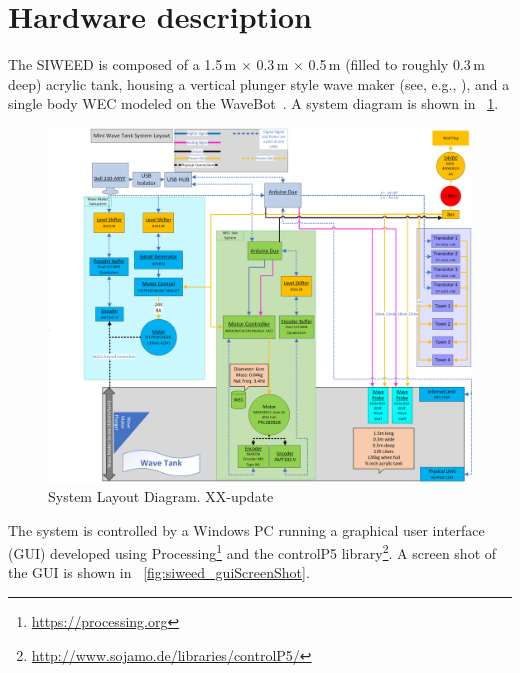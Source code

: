 \documentclass[11pt, letterpaper]{article}
\begin{document}
\section{Hardware description} %
The SIWEED is composed of a 1.5\,m $\times{}$ 0.3\,m $\times{}$ 0.5\,m (filled to roughly 0.3\,m deep) acrylic tank, housing a vertical plunger style wave maker (see, e.g., \cite{hyun1976simplified}), and a single body WEC modeled on the WaveBot~\cite{Coe2016a}.
A system diagram is shown in \figurename~\ref{fig:siweed_layout}.
\begin{figure}[tb]
  \centering
  \includegraphics[width=1\textwidth]{diagrams/System Layout.png}
  \caption{System Layout Diagram. XX-update}
  \label{fig:siweed_layout}
\end{figure}
The system is controlled by a Windows PC running a graphical user interface (GUI) developed using Processing\footnote{\url{https://processing.org}} and the controlP5 library\footnote{\url{http://www.sojamo.de/libraries/controlP5/}}.
A screen shot of the GUI is shown in \figurename~\ref{fig:siweed_guiScreenShot}.
\end{document}

